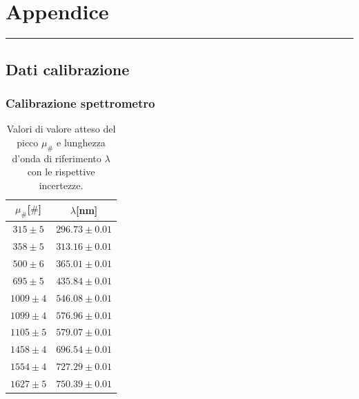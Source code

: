 \newpage
{\centering
\section{Appendice}
}
\medskip
{\color{gray}\hrule}
\subsection{Dati calibrazione}
\subsubsection{Calibrazione spettrometro}

\begin{table}[H]
    \centering
    \begin{tabular}{|c|c|}
        \hline
        
        \textbf{$\mu_{\#}$[$\#$]} & \textbf{$\lambda$[nm]}  \\ \hline \hline
        $ 315 \pm 5 $  &  $ 296.73  \pm  0.01 $  \\ \hline        
        $ 358 \pm 5$  &  $ 313.16  \pm  0.01 $  \\ \hline
        $ 500 \pm 6 $  &  $ 365.01  \pm  0.01 $   \\ \hline
        $ 695 \pm 5 $  &  $ 435.84  \pm  0.01 $  \\ \hline
        $ 1009 \pm 4 $  &  $ 546.08  \pm  0.01 $   \\ \hline
        $ 1099 \pm 4 $  &  $ 576.96  \pm  0.01 $  \\ \hline
        $ 1105 \pm 5 $  &  $ 579.07  \pm  0.01 $ \\ \hline
        $ 1458 \pm 4 $  &  $ 696.54  \pm  0.01 $  \\ \hline
        $ 1554 \pm 4 $  &  $ 727.29  \pm  0.01 $ \\ \hline
        $ 1627 \pm 5 $  &  $ 750.39  \pm  0.01 $  \\ \hline
        
    \end{tabular}
    \caption{\footnotesize Valori di valore atteso del picco $\mu_{\#}$ e lunghezza d'onda di riferimento $\lambda$ con le rispettive incertezze.}
    \label{tab:cal_spettr}    
\end{table}


